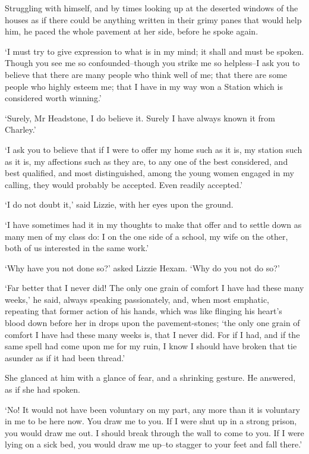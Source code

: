 Struggling with himself, and by times looking up at the deserted windows
of the houses as if there could be anything written in their grimy panes
that would help him, he paced the whole pavement at her side, before he
spoke again.

‘I must try to give expression to what is in my mind; it shall and must
be spoken. Though you see me so confounded--though you strike me so
helpless--I ask you to believe that there are many people who think well
of me; that there are some people who highly esteem me; that I have in
my way won a Station which is considered worth winning.’

‘Surely, Mr Headstone, I do believe it. Surely I have always known it
from Charley.’

‘I ask you to believe that if I were to offer my home such as it is, my
station such as it is, my affections such as they are, to any one of the
best considered, and best qualified, and most distinguished, among the
young women engaged in my calling, they would probably be accepted. Even
readily accepted.’

‘I do not doubt it,’ said Lizzie, with her eyes upon the ground.

‘I have sometimes had it in my thoughts to make that offer and to settle
down as many men of my class do: I on the one side of a school, my wife
on the other, both of us interested in the same work.’

‘Why have you not done so?’ asked Lizzie Hexam. ‘Why do you not do so?’

‘Far better that I never did! The only one grain of comfort I have had
these many weeks,’ he said, always speaking passionately, and, when
most emphatic, repeating that former action of his hands, which was
like flinging his heart’s blood down before her in drops upon the
pavement-stones; ‘the only one grain of comfort I have had these many
weeks is, that I never did. For if I had, and if the same spell had come
upon me for my ruin, I know I should have broken that tie asunder as if
it had been thread.’

She glanced at him with a glance of fear, and a shrinking gesture. He
answered, as if she had spoken.

‘No! It would not have been voluntary on my part, any more than it is
voluntary in me to be here now. You draw me to you. If I were shut up in
a strong prison, you would draw me out. I should break through the wall
to come to you. If I were lying on a sick bed, you would draw me up--to
stagger to your feet and fall there.’

